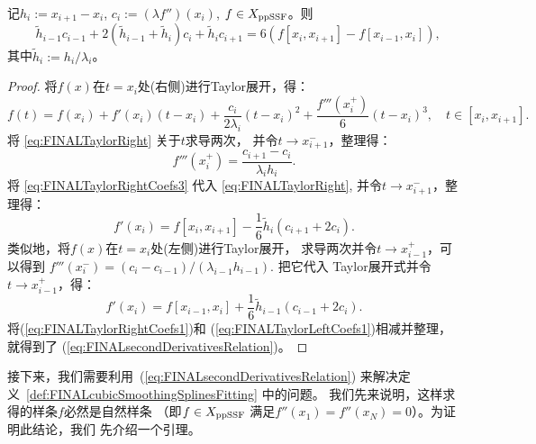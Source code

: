\begin{lem}
  \label{lem:FINALsecondDerivativesRelation}
  记$h_{i}:=x_{i+1}-x_{i}$, 
  $c_{i}:=(\lambda f'')(x_{i})$, $f\in X_{\textnormal{ppSSF}}$。则
  \begin{equation}
    \label{eq:FINALsecondDerivativesRelation}
      \ \ \ \tilde{h}_{i-1}c_{i-1}+
      2(\tilde{h}_{i-1}+\tilde{h}_{i})c_{i}+
      \tilde{h}_{i}c_{i+1}
      =6\left(f[x_{i},x_{i+1}]-f[x_{i-1},x_{i}]\right),
  \end{equation}
  其中$\tilde{h}_{i}:={h_{i}}/{\lambda_{i}}$。
\end{lem}
\begin{proof}
  将$f(x)$在$t=x_{i}$处(右侧)进行Taylor展开，得：
  \begin{equation}
    \label{eq:FINALTaylorRight}
    f(t)=f(x_{i})+f'(x_{i})(t-x_{i})+
                   \frac{c_{i}}{2\lambda_{i}}(t-x_{i})^{2}
    +\frac{f'''(x_{i}^{+})}{6}(t-x_{i})^{3},\quad t\in [x_{i},x_{i+1}].
  \end{equation}
  将 \eqref{eq:FINALTaylorRight} 关于$t$求导两次，
  并令$t\to x_{i+1}^{-}$，整理得：
  \begin{equation}
    \label{eq:FINALTaylorRightCoefs3}
    f'''(x_{i}^{+})=
    \frac{c_{i+1}-c_{i}}{\lambda_{i}h_{i}}. 
  \end{equation}
  将 \eqref{eq:FINALTaylorRightCoefs3} 代入
  \eqref{eq:FINALTaylorRight}, 并令$t\to x_{i+1}^{-}$，整理得：
  \begin{equation}
    \label{eq:FINALTaylorRightCoefs1}
    f'(x_{i})=f[x_{i},x_{i+1}]
    -\frac{1}{6}\tilde{h}_{i}(c_{i+1}+2c_{i}).  
  \end{equation}
  类似地，将$f(x)$在$t=x_{i}$处(左侧)进行Taylor展开，
  求导两次并令$t\to x_{i-1}^{+}$，可以得到
  $f'''(x_{i}^{-})
  =(c_{i}-c_{i-1})/(\lambda_{i-1}h_{i-1})$. 把它代入
  Taylor展开式并令$t\to x_{i-1}^{+}$，得：
  \begin{equation}
    \label{eq:FINALTaylorLeftCoefs1}
    f'(x_{i})=f[x_{i-1},x_{i}]
    +\frac{1}{6}\tilde{h}_{i-1}(c_{i-1}+2c_{i}).  
  \end{equation}
  将(\ref{eq:FINALTaylorRightCoefs1})和
  (\ref{eq:FINALTaylorLeftCoefs1})相减并整理，就得到了
  (\ref{eq:FINALsecondDerivativesRelation})。
\end{proof}

接下来，我们需要利用~(\ref{eq:FINALsecondDerivativesRelation})
来解决定义~\ref{def:FINALcubicSmoothingSplinesFitting} 中的问题。
我们先来说明，这样求得的样条$f$必然是自然样条
（即$f\in X_{\textnormal{ppSSF}}$
满足$f''(x_{1})=f''(x_{N})=0$）。为证明此结论，我们
先介绍一个引理。

